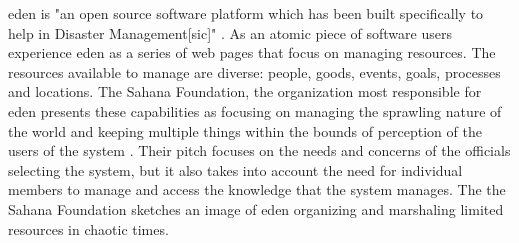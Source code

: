 \documentclass[a4paper,man,natbib]{apa6}
\begin{document}
   \acrfull{eden} is "an open source software platform which has been built specifically to help in Disaster Management[sic]" \citep{Sahana_Foundation2011-od}. As an atomic piece of software users experience \acrshort{eden} as a series of web pages that focus on managing resources. The resources available to manage are diverse: people, goods, events, goals, processes and locations. The Sahana Foundation, the organization most responsible for \acrshort{eden} presents these capabilities as focusing on managing the sprawling nature of the world and keeping multiple things within the bounds of perception of the users of the system \citep{Sahana_Foundation_undated-wu}. Their pitch focuses on the needs and concerns of the officials selecting the system, but it also takes into account the need for individual members to manage and access the knowledge that the system manages. The the Sahana Foundation sketches an image of \acrshort{eden} organizing and marshaling limited resources in chaotic times. 
   
  
   \printnoidxglossaries
   \setlength{\parindent}{4em}
   
\end{document}
